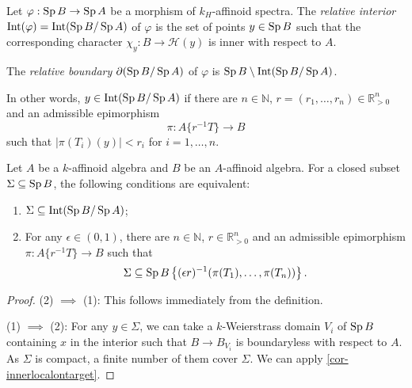 \begin{definition}
    Let $\varphi:\operatorname{Sp} B\rightarrow \operatorname{Sp} A$ be a morphism of $k_H$-affinoid spectra. The \emph{relative interior} $\operatorname{Int}(\varphi)=\operatorname{Int}(\operatorname{Sp} B/\operatorname{Sp} A)$ of $\varphi$ is the set of points $y\in \operatorname{Sp} B$ such that the corresponding character $\chi_y:B\rightarrow \mathscr{H}(y)$ is inner with respect to $A$. 

    The \emph{relative boundary} $\partial(\operatorname{Sp} B/\operatorname{Sp} A)$ of $\varphi$ is $\operatorname{Sp} B\setminus \operatorname{Int}(\operatorname{Sp} B/\operatorname{Sp} A)$.
\end{definition}
In other words, $y\in \operatorname{Int}(\operatorname{Sp} B/\operatorname{Sp} A)$ if there are $n\in \mathbb{N}$, $r=(r_1,\ldots,r_n)\in \mathbb{R}^n_{>0}$ and an admissible epimorphism
\[
    \pi: A\{r^{-1}T\}\rightarrow B    
\] 
such that $|\pi(T_i)(y)|<r_i$ for $i=1,\ldots,n$.


\begin{proposition}\label{prop-closedsetininteriorcri}
    Let $A$ be a $k$-affinoid algebra and $B$ be an $A$-affinoid algebra. For a closed subset $\Sigma\subseteq \operatorname{Sp} B$, the following conditions are equivalent:
    \begin{enumerate}
        \item $\Sigma\subseteq \operatorname{Int}(\operatorname{Sp} B/\operatorname{Sp} A)$;
        \item For any $\epsilon\in (0,1)$, there are $n\in \mathbb{N}$, $r\in \mathbb{R}^n_{>0}$ and an admissible epimorphism $\pi: A\{r^{-1}T\}\rightarrow B$ such that 
        \[
            \Sigma\subseteq \operatorname{Sp} B\left\{(\epsilon r)^{-1}(\pi(T_1),\ldots,\pi(T_n))\right\}.    
        \]
    \end{enumerate}
\end{proposition}
\begin{proof}
    (2) $\implies$ (1): This follows immediately from the definition.

    (1) $\implies$ (2): For any $y\in \Sigma$, we can take a $k$-Weierstrass domain $V_i$ of $\operatorname{Sp} B$ containing $x$ in the interior such that $B\rightarrow B_{V_i}$ is boundaryless with respect to $A$. As $\Sigma$ is compact, a finite number of them cover $\Sigma$. We can apply \cref{cor-innerlocalontarget}.
\end{proof}



